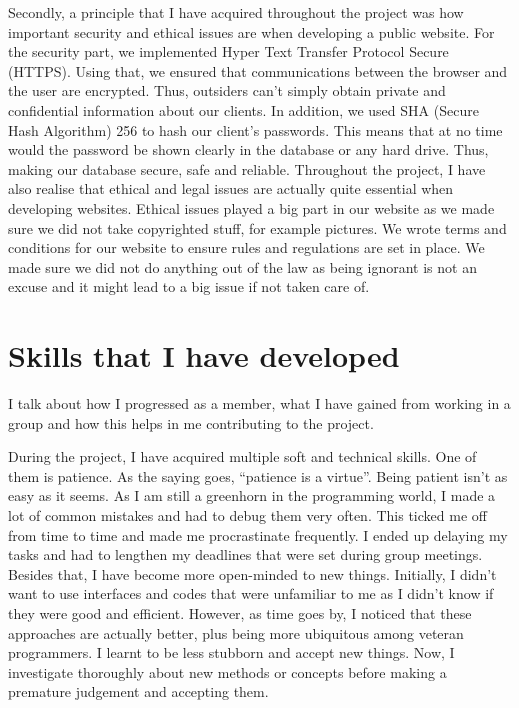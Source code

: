 \documentclass[a4paper]{article}
\begin{document}
Secondly, a principle that I have acquired throughout the project was how important security and ethical issues are when developing a public website. For the security part, we implemented Hyper Text Transfer Protocol Secure (HTTPS). Using that, we ensured that communications between the browser and the user are encrypted. Thus, outsiders can’t simply obtain private and confidential information about our clients. In addition, we used SHA (Secure Hash Algorithm) 256 to hash our client’s passwords. This means that at no time would the password be shown clearly in the database or any hard drive. Thus, making our database secure, safe and reliable. Throughout the project, I have also realise that ethical and legal issues are actually quite essential when developing websites. Ethical issues played a big part in our website as we made sure we did not take copyrighted stuff, for example pictures. We wrote terms and conditions for our website to ensure rules and regulations are set in place. We made sure we did not do anything out of the law as being ignorant is not an excuse and it might lead to a big issue if not taken care of. 
\newpage


\section{Skills that I have developed}\newline
I talk about how I progressed as a member, what I have gained from working in a group and how this helps in me contributing to the project.
\newline

During the project, I have acquired multiple soft and technical skills. One of them is patience. As the saying goes, “patience is a virtue”. Being patient isn’t as easy as it seems. As I am still a greenhorn in the programming world, I made a lot of common mistakes and had to debug them very often. This ticked me off from time to time and made me procrastinate frequently. I ended up delaying my tasks and had to lengthen my deadlines that were set during group meetings. Besides that, I have become more open-minded to new things. Initially, I didn’t want to use interfaces and codes that were unfamiliar to me as I didn’t know if they were good and efficient. However, as time goes by, I noticed that these approaches are actually better, plus being more ubiquitous among veteran programmers. I learnt to be less stubborn and accept new things. Now, I investigate thoroughly about new methods or concepts before making a premature judgement and accepting them.
\newline
\end{document}
